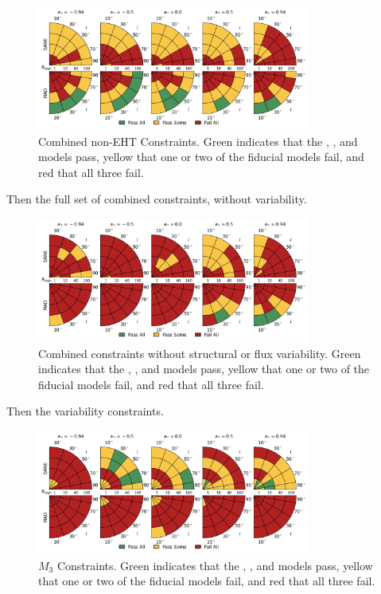 \begin{figure}
  \centering
  \includegraphics[width=0.8\textwidth]{./figures/Non_Interferometric_Constraints.png}
  \caption{Combined non-EHT Constraints.  Green indicates that the \kharma, \bhac, and \hamr models pass, yellow that one or two of the fiducial models fail, and red that all three fail.}
  \label{fig:noneht_pizza}
\end{figure}

Then the full set of combined constraints, without variability.

\begin{figure}
  \centering
  \includegraphics[width=0.8\textwidth]{./figures/All_Constraints.png}
  \caption{Combined constraints without structural or flux variability.  Green indicates that the \kharma, \bhac, and \hamr models pass, yellow that one or two of the fiducial models fail, and red that all three fail.}
  \label{fig:all_pizza}
\end{figure}

Then the variability constraints.

\begin{figure}
  \centering
  \includegraphics[width=0.8\textwidth]{./figures/230GHz_3Hr_MI_Constraints.png}
  \caption{$M_3$ Constraints.  Green indicates that the \kharma, \bhac, and \hamr models pass, yellow that one or two of the fiducial models fail, and red that all three fail.}
  \label{fig:m3_pizza}
\end{figure}

